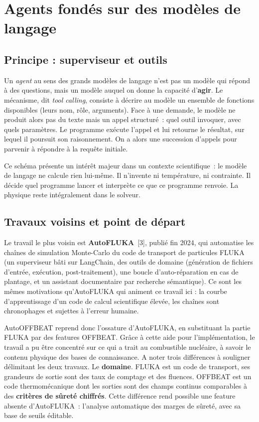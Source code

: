 \documentclass[12pt,a4paper,french]{report}
\begin{document}
\section{Agents fondés sur des modèles de langage}

\subsection{Principe : superviseur et outils}

Un \textit{agent} au sens des grands modèles de langage n'est pas un modèle
qui répond à des questions, mais un modèle auquel on donne la capacité
d'\textbf{agir}. Le mécanisme, dit \textit{tool calling}, consiste à décrire au
modèle un ensemble de fonctions disponibles (leurs nom, rôle, arguments). Face à une demande, le modèle ne produit alors pas du texte mais un
appel structuré~: quel outil invoquer, avec quels paramètres. Le programme
exécute l'appel et lui retourne le résultat, sur lequel il poursuit son
raisonnement. On a alors une succession d'appels pour parvenir à répondre à la requête initiale.

Ce schéma présente un intérêt majeur dans un contexte scientifique~: le modèle
de langage ne calcule rien lui-même. Il n'invente ni température, ni contrainte.
Il décide quel programme lancer et interprète ce que ce programme renvoie. La
physique reste intégralement dans le solveur.

\subsection{Travaux voisins et point de départ}

Le travail le plus voisin est \textbf{AutoFLUKA}~[3], publié fin
\num{2024}, qui automatise les chaînes de simulation Monte-Carlo du code de
transport de particules FLUKA (un superviseur bâti sur LangChain, des outils de
domaine (génération de fichiers d'entrée, exécution, post-traitement), une
boucle d'auto-réparation en cas de plantage, et un assistant documentaire par
recherche sémantique). Ce sont les mêmes motivations qu'AutoFLUKA qui animent ce travail ici : la courbe d'apprentissage d'un code de calcul
scientifique élevée, les chaînes sont chronophages et sujettes à l'erreur
humaine.

AutoOFFBEAT reprend donc l'ossature d'AutoFLUKA, en
substituant la partie FLUKA par des features OFFBEAT. Grâce à cette aide pour l'implémentation, le travail a pu être concentré sur ce qui a trait au combustible nucléaire, à savoir le contenu physique des
bases de connaissance. A noter trois différences à souligner délimitant les deux travaux.
Le \textbf{domaine}. FLUKA est un code de transport, ses grandeurs de
sortie sont des taux de comptage et des fluences. OFFBEAT est un code
thermomécanique dont les sorties sont des champs continus comparables à des
\textbf{critères de sûreté chiffrés}. Cette différence rend possible une feature absente d'AutoFLUKA~: l'analyse automatique des marges
de sûreté, avec sa base de seuils éditable.
\end{document}
